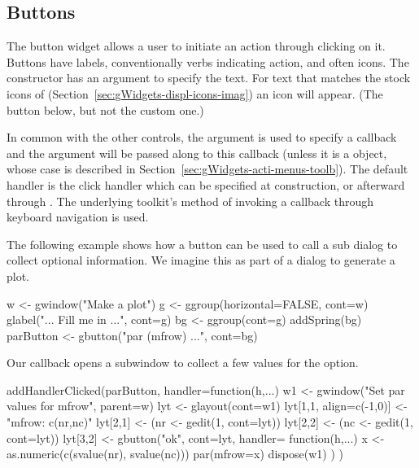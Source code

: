 \subsection{Buttons}
\label{sec:gWidgets-buttons}

The button widget allows a user to initiate an action through clicking
on it. Buttons have labels, conventionally verbs indicating action,
and often icons. The  constructor has an argument
 to specify the text.  For text that matches
the stock icons of 
(Section~\ref{sec:gWidgets-displ-icons-imag}) an icon will
appear. (The  button below, but not the custom  one.)

In common with the other controls, the argument
 is used to specify a callback and the
 argument will be passed along to this
callback (unless it is a  object, whose case is
described in Section~\ref{sec:gWidgets-acti-menus-toolb}).  The
default handler is the click handler which can be specified at
construction, or afterward through
. The underlying toolkit's method
of invoking a callback through keyboard navigation is used.

The following example shows how a button can be used to call a sub
dialog to collect optional information. We imagine this as part of a
dialog to generate a plot.

\begin{Schunk}
\begin{Sinput}
 w <- gwindow("Make a plot")
 g <- ggroup(horizontal=FALSE, cont=w)
 glabel("... Fill me in ...", cont=g)
 bg <- ggroup(cont=g)
 addSpring(bg)
 parButton <- gbutton("par (mfrow) ...", cont=bg)
\end{Sinput}
\end{Schunk}
Our callback opens a subwindow to collect a few values for the
 option.
\begin{Schunk}
\begin{Sinput}
 addHandlerClicked(parButton, handler=function(h,...) {
   w1 <- gwindow("Set par values for mfrow", parent=w)
   lyt <- glayout(cont=w1)
   lyt[1,1, align=c(-1,0)] <- "mfrow: c(nr,nc)"
   lyt[2,1] <- (nr <- gedit(1, cont=lyt))
   lyt[2,2] <- (nc <- gedit(1, cont=lyt))
   lyt[3,2] <- gbutton("ok", cont=lyt, handler=
                 function(h,...) {
                   x <- as.numeric(c(svalue(nr), svalue(nc)))
                   par(mfrow=x)
                   dispose(w1)
                 })
 })
\end{Sinput}
\end{Schunk}



